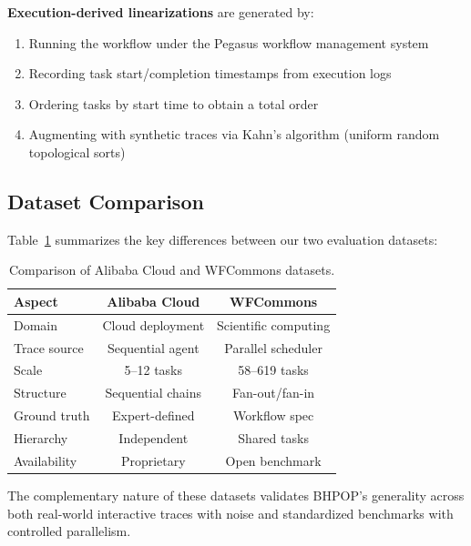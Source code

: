 \textbf{Execution-derived linearizations} are generated by:
\begin{enumerate}[leftmargin=*,nosep]
    \item Running the workflow under the Pegasus workflow management system
    \item Recording task start/completion timestamps from execution logs
    \item Ordering tasks by start time to obtain a total order
    \item Augmenting with synthetic traces via Kahn's algorithm (uniform random topological sorts)
\end{enumerate}

\subsection{Dataset Comparison}

Table~\ref{tab:dataset_comparison} summarizes the key differences between our two evaluation datasets:

\begin{table}[htbp]
\caption{Comparison of Alibaba Cloud and WFCommons datasets.}
\label{tab:dataset_comparison}
\centering
\small
\begin{tabular}{lcc}
\toprule
\textbf{Aspect} & \textbf{Alibaba Cloud} & \textbf{WFCommons} \\
\midrule
Domain & Cloud deployment & Scientific computing \\
Trace source & Sequential agent & Parallel scheduler \\
Scale & 5--12 tasks & 58--619 tasks \\
Structure & Sequential chains & Fan-out/fan-in \\
Ground truth & Expert-defined & Workflow spec \\
Hierarchy & Independent & Shared tasks \\
Availability & Proprietary & Open benchmark \\
\bottomrule
\end{tabular}
\end{table}

The complementary nature of these datasets validates \textsc{BHPOP}'s generality across both real-world interactive traces with noise and standardized benchmarks with controlled parallelism.
